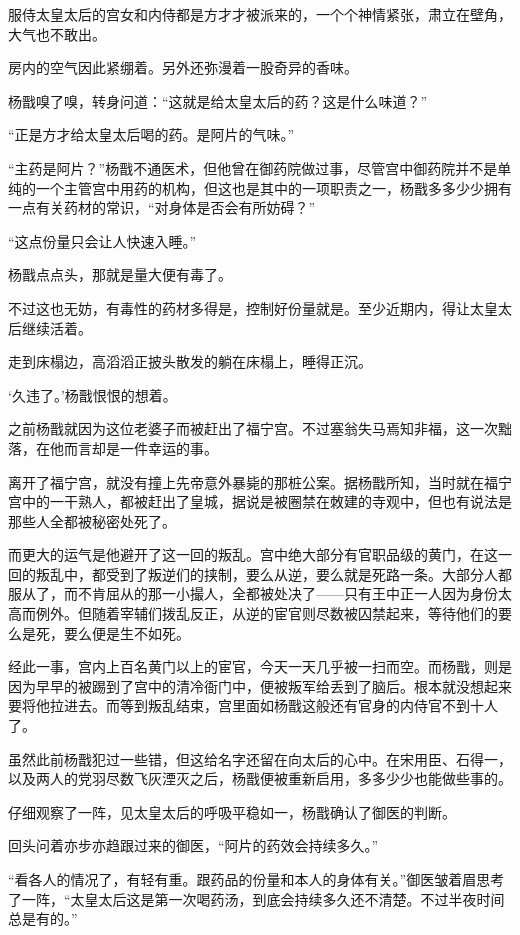 服侍太皇太后的宫女和内侍都是方才才被派来的，一个个神情紧张，肃立在壁角，大气也不敢出。

房内的空气因此紧绷着。另外还弥漫着一股奇异的香味。

杨戬嗅了嗅，转身问道：“这就是给太皇太后的药？这是什么味道？”

“正是方才给太皇太后喝的药。是阿片的气味。”

“主药是阿片？”杨戬不通医术，但他曾在御药院做过事，尽管宫中御药院并不是单纯的一个主管宫中用药的机构，但这也是其中的一项职责之一，杨戬多多少少拥有一点有关药材的常识，“对身体是否会有所妨碍？”

“这点份量只会让人快速入睡。”

杨戬点点头，那就是量大便有毒了。

不过这也无妨，有毒性的药材多得是，控制好份量就是。至少近期内，得让太皇太后继续活着。

走到床榻边，高滔滔正披头散发的躺在床榻上，睡得正沉。

‘久违了。’杨戬恨恨的想着。

之前杨戬就因为这位老婆子而被赶出了福宁宫。不过塞翁失马焉知非福，这一次黜落，在他而言却是一件幸运的事。

离开了福宁宫，就没有撞上先帝意外暴毙的那桩公案。据杨戬所知，当时就在福宁宫中的一干熟人，都被赶出了皇城，据说是被圈禁在敇建的寺观中，但也有说法是那些人全都被秘密处死了。

而更大的运气是他避开了这一回的叛乱。宫中绝大部分有官职品级的黄门，在这一回的叛乱中，都受到了叛逆们的挟制，要么从逆，要么就是死路一条。大部分人都服从了，而不肯屈从的那一小撮人，全都被处决了——只有王中正一人因为身份太高而例外。但随着宰辅们拨乱反正，从逆的宦官则尽数被囚禁起来，等待他们的要么是死，要么便是生不如死。

经此一事，宫内上百名黄门以上的宦官，今天一天几乎被一扫而空。而杨戬，则是因为早早的被踢到了宫中的清冷衙门中，便被叛军给丢到了脑后。根本就没想起来要将他拉进去。而等到叛乱结束，宫里面如杨戬这般还有官身的内侍官不到十人了。

虽然此前杨戬犯过一些错，但这给名字还留在向太后的心中。在宋用臣、石得一，以及两人的党羽尽数飞灰湮灭之后，杨戬便被重新启用，多多少少也能做些事的。

仔细观察了一阵，见太皇太后的呼吸平稳如一，杨戬确认了御医的判断。

回头问着亦步亦趋跟过来的御医，“阿片的药效会持续多久。”

“看各人的情况了，有轻有重。跟药品的份量和本人的身体有关。”御医皱着眉思考了一阵，“太皇太后这是第一次喝药汤，到底会持续多久还不清楚。不过半夜时间总是有的。”

